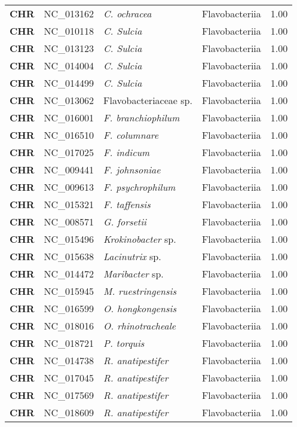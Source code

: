 \begin{adjustwidth}{-3cm}{2cm}
{\begin{supertabular}{>{\bfseries}l|p{0.1\textwidth}p{0.14\textwidth}l|l}
CHR & NC\_013162 & \textit{C. ochracea} & Flavobacteriia & 1.00\\
CHR & NC\_010118 & \textit{C. Sulcia} & Flavobacteriia & 1.00\\
CHR & NC\_013123 & \textit{C. Sulcia} & Flavobacteriia & 1.00\\
CHR & NC\_014004 & \textit{C. Sulcia} & Flavobacteriia & 1.00\\
CHR & NC\_014499 & \textit{C. Sulcia} & Flavobacteriia & 1.00\\
CHR & NC\_013062 & Flavobacteriaceae sp.  & Flavobacteriia & 1.00\\
CHR & NC\_016001 & \textit{F. branchiophilum} & Flavobacteriia & 1.00\\
CHR & NC\_016510 & \textit{F. columnare} & Flavobacteriia & 1.00\\
CHR & NC\_017025 & \textit{F. indicum} & Flavobacteriia & 1.00\\
CHR & NC\_009441 & \textit{F. johnsoniae} & Flavobacteriia & 1.00\\
CHR & NC\_009613 & \textit{F. psychrophilum} & Flavobacteriia & 1.00\\
CHR & NC\_015321 & \textit{F. taffensis} & Flavobacteriia & 1.00\\
CHR & NC\_008571 & \textit{G. forsetii} & Flavobacteriia & 1.00\\
CHR & NC\_015496 & \textit{Krokinobacter} sp. & Flavobacteriia & 1.00\\
CHR & NC\_015638 & \textit{Lacinutrix} sp. & Flavobacteriia & 1.00\\
CHR & NC\_014472 & \textit{Maribacter} sp. & Flavobacteriia & 1.00\\
CHR & NC\_015945 & \textit{M. ruestringensis} & Flavobacteriia & 1.00\\
CHR & NC\_016599 & \textit{O. hongkongensis} & Flavobacteriia & 1.00\\
CHR & NC\_018016 & \textit{O. rhinotracheale} & Flavobacteriia & 1.00\\
CHR & NC\_018721 & \textit{P. torquis} & Flavobacteriia & 1.00\\
CHR & NC\_014738 & \textit{R. anatipestifer} & Flavobacteriia & 1.00\\
CHR & NC\_017045 & \textit{R. anatipestifer} & Flavobacteriia & 1.00\\
CHR & NC\_017569 & \textit{R. anatipestifer} & Flavobacteriia & 1.00\\
CHR & NC\_018609 & \textit{R. anatipestifer} & Flavobacteriia & 1.00\\

\end{supertabular}}
\end{adjustwidth}
